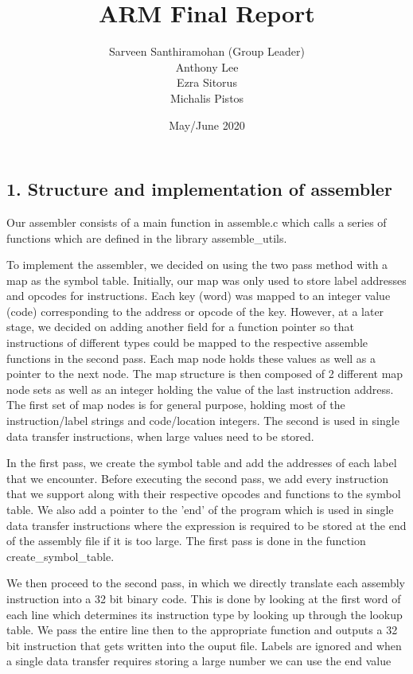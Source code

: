 \documentclass[a4paper]{article}
\title{ARM Final Report}
\author{Sarveen Santhiramohan (Group Leader) \\ Anthony Lee\\ Ezra Sitorus\\ Michalis Pistos}
\date{May/June 2020}
\begin{document}
\maketitle

\bigskip
\subsection*{1. Structure and implementation of assembler}

Our assembler consists of a main function in assemble.c which calls a series of functions which
are defined in the library assemble{\_}utils. 

To implement the assembler, we decided on using the two pass method with a map as the symbol table.
Initially, our map was only used to store label addresses and opcodes for instructions. Each
key (word) was mapped to an integer value (code) corresponding to the address or opcode of the key.
However, at a later stage, we decided on adding another field for a function pointer so that instructions
of different types could be mapped to the respective assemble functions in the second pass. Each map node holds
these values as well as a pointer to the next node. The map structure is then composed of 2 different map node sets
as well as an integer holding the value of the last instruction address. The first set of map nodes is for general 
purpose, holding most of the instruction/label strings and code/location integers. The second is used in single data
transfer instructions, when large values need to be stored.
\par
In the first pass, we create the symbol table and add the addresses of each label that we encounter.
Before executing the second pass, we add every instruction that we support along with their
respective opcodes and functions to the symbol table. We also add a pointer to the 'end' of the program
which is used in single data transfer instructions where the expression is required to be stored at the 
end of the assembly file if it is too large. The first pass is done in the function create{\_}symbol{\_}table.
\par
We then proceed to the second pass, in which we directly translate each assembly instruction into a 32 bit binary code.
This is done by looking at the first word of each line which determines its instruction type by looking up through the 
lookup table. We pass the entire line then to the appropriate function and outputs a 32 bit instruction that gets written 
into the ouput file. Labels are ignored and when a single data transfer requires storing a large number we can use the end value 
\end{document}
